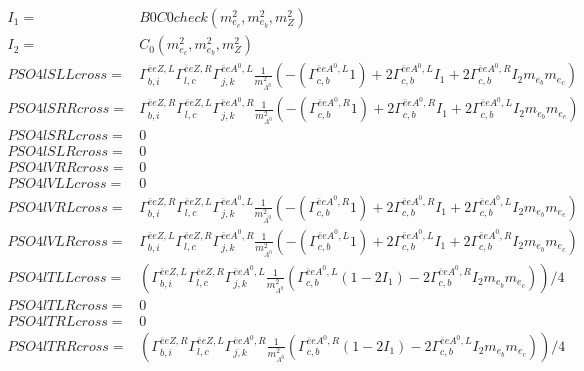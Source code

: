 \documentclass[A4,landscape]{article}
\begin{document}
\begin{align} 
I_1= & B0C0check(m^2_{e_{{c}}}, m^2_{e_{{b}}}, m^2_{Z}) \\ 
I_2= & C_0(m^2_{e_{{c}}}, m^2_{e_{{b}}}, m^2_{Z}) \\ 
  PSO4lSLLcross= &  \Gamma^{\bar{e}e Z ,L}_{b, i} \Gamma^{\bar{e}e Z ,R}_{l, c} \Gamma^{\bar{e}e A^0 ,L}_{j, k} \frac{1}{m^2_{A^0}} (-(\Gamma^{\bar{e}e A^0 ,L}_{c, b} 1) + 2 \Gamma^{\bar{e}e A^0 ,L}_{c, b} I_1 + 2 \Gamma^{\bar{e}e A^0 ,R}_{c, b} I_2 m_{e_{{b}}} m_{e_{{c}}}) \\ 
  PSO4lSRRcross= &  \Gamma^{\bar{e}e Z ,R}_{b, i} \Gamma^{\bar{e}e Z ,L}_{l, c} \Gamma^{\bar{e}e A^0 ,R}_{j, k} \frac{1}{m^2_{A^0}} (-(\Gamma^{\bar{e}e A^0 ,R}_{c, b} 1) + 2 \Gamma^{\bar{e}e A^0 ,R}_{c, b} I_1 + 2 \Gamma^{\bar{e}e A^0 ,L}_{c, b} I_2 m_{e_{{b}}} m_{e_{{c}}}) \\ 
  PSO4lSRLcross= & 0 \\ 
  PSO4lSLRcross= & 0 \\ 
  PSO4lVRRcross= & 0 \\ 
  PSO4lVLLcross= & 0 \\ 
  PSO4lVRLcross= &  \Gamma^{\bar{e}e Z ,R}_{b, i} \Gamma^{\bar{e}e Z ,L}_{l, c} \Gamma^{\bar{e}e A^0 ,L}_{j, k} \frac{1}{m^2_{A^0}} (-(\Gamma^{\bar{e}e A^0 ,R}_{c, b} 1) + 2 \Gamma^{\bar{e}e A^0 ,R}_{c, b} I_1 + 2 \Gamma^{\bar{e}e A^0 ,L}_{c, b} I_2 m_{e_{{b}}} m_{e_{{c}}}) \\ 
  PSO4lVLRcross= &  \Gamma^{\bar{e}e Z ,L}_{b, i} \Gamma^{\bar{e}e Z ,R}_{l, c} \Gamma^{\bar{e}e A^0 ,R}_{j, k} \frac{1}{m^2_{A^0}} (-(\Gamma^{\bar{e}e A^0 ,L}_{c, b} 1) + 2 \Gamma^{\bar{e}e A^0 ,L}_{c, b} I_1 + 2 \Gamma^{\bar{e}e A^0 ,R}_{c, b} I_2 m_{e_{{b}}} m_{e_{{c}}}) \\ 
  PSO4lTLLcross= & ( \Gamma^{\bar{e}e Z ,L}_{b, i} \Gamma^{\bar{e}e Z ,R}_{l, c} \Gamma^{\bar{e}e A^0 ,L}_{j, k} \frac{1}{m^2_{A^0}} (\Gamma^{\bar{e}e A^0 ,L}_{c, b} (1 - 2 I_1) - 2 \Gamma^{\bar{e}e A^0 ,R}_{c, b} I_2 m_{e_{{b}}} m_{e_{{c}}}))/4 \\ 
  PSO4lTLRcross= & 0 \\ 
  PSO4lTRLcross= & 0 \\ 
  PSO4lTRRcross= & ( \Gamma^{\bar{e}e Z ,R}_{b, i} \Gamma^{\bar{e}e Z ,L}_{l, c} \Gamma^{\bar{e}e A^0 ,R}_{j, k} \frac{1}{m^2_{A^0}} (\Gamma^{\bar{e}e A^0 ,R}_{c, b} (1 - 2 I_1) - 2 \Gamma^{\bar{e}e A^0 ,L}_{c, b} I_2 m_{e_{{b}}} m_{e_{{c}}}))/4 \\ 
\end{align} 
\end{document}
